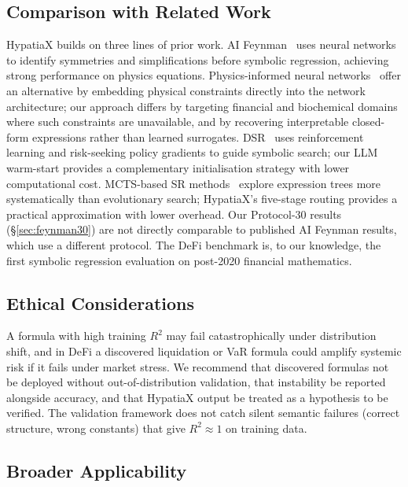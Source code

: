 \documentclass[twoside,11pt]{article}
\newcommand{\Rsq}{R^{2}}
\begin{document}
\subsection{Comparison with Related Work}\label{subsec:comparison-with-related-work}
\label{sec:disc_related}

HypatiaX builds on three lines of prior work. AI Feynman~\citep{udrescu2020ai} uses neural networks to identify symmetries and simplifications before symbolic regression, achieving strong performance on physics equations. Physics-informed neural networks~\citep{raissi2019physics,karniadakis2021physics} offer an alternative by embedding physical constraints directly into the network architecture; our approach differs by targeting financial and biochemical domains where such constraints are unavailable, and by recovering interpretable closed-form expressions rather than learned surrogates. DSR~\citep{petersen2021deep,landajuela2022unified} uses reinforcement learning and risk-seeking policy gradients to guide symbolic search; our LLM warm-start provides a complementary initialisation strategy with lower computational cost. MCTS-based SR methods~\citep{sun2022symbolic} explore expression trees more systematically than evolutionary search; HypatiaX's five-stage routing provides a practical approximation with lower overhead. Our Protocol-30 results (\S\ref{sec:feynman30}) are not directly comparable to published AI Feynman results, which use a different protocol. The DeFi benchmark is, to our knowledge, the first symbolic regression evaluation on post-2020 financial mathematics.

\subsection{Ethical Considerations}\label{subsec:ethical-considerations}
\label{sec:disc_ethics}

A formula with high training $\Rsq$ may fail catastrophically under distribution shift, and in DeFi a discovered liquidation or VaR formula could amplify systemic risk if it fails under market stress. We recommend that discovered formulas not be deployed without out-of-distribution validation, that instability be reported alongside accuracy, and that HypatiaX output be treated as a hypothesis to be verified. The validation framework does not catch silent semantic failures (correct structure, wrong constants) that give $\Rsq\approx1$ on training data.

\subsection{Broader Applicability}\label{subsec:broader-applicability}
\label{sec:disc_broader}
\end{document}
